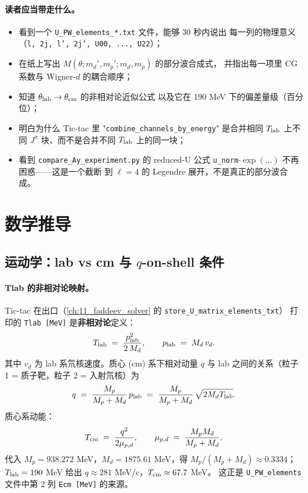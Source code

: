 \paragraph{读者应当带走什么。}
\begin{itemize}
  \item 看到一个 \texttt{U\_PW\_elements\_*.txt} 文件，能够 30 秒内说出
        每一列的物理意义（\texttt{l, 2j, l', 2j', U00, ..., U22}）；
  \item 在纸上写出 \(M(\theta; m_d', m_p'; m_d, m_p)\) 的部分波合成式，
        并指出每一项里 CG 系数与 Wigner-\(d\) 的耦合顺序；
  \item 知道 \(\theta_{\rm lab} \to \theta_{\rm cm}\) 的非相对论近似公式
        以及它在 190 MeV 下的偏差量级（百分位）；
  \item 明白为什么 Tic-tac 里 "\texttt{combine\_channels\_by\_energy}"
        是合并相同 \({T_{\text{lab}}}\) 上不同 \(J^\pi\) 块、而不是合并不同
        \({T_{\text{lab}}}\) 上的同一块；
  \item 看到 \texttt{compare\_Ay\_experiment.py} 的 reduced-U 公式
        \texttt{u\_norm}\(\cdot \exp(\ldots)\) 不再困惑——这是一个截断
        到 \(\ell=4\) 的 Legendre 展开，不是真正的部分波合成。
\end{itemize}

\section{数学推导}
\label{sec:ch12-math}

\subsection{运动学：lab vs cm 与 \texorpdfstring{$q$-on-shell}{q-on-shell} 条件}
\label{subsec:ch12-kinematics}

\paragraph{Tlab 的非相对论映射。}
Tic-tac 在出口（\cref{ch:11_faddeev_solver} 的 \texttt{store\_U\_matrix\_elements\_txt}）
打印的 \texttt{Tlab [MeV]} 是\textbf{非相对论}定义：
\begin{equation}
\label{eq:ch12-Tlab-def}
{T_{\text{lab}}} \;=\; \frac{p_{\rm lab}^2}{2\,M_d}, \qquad
p_{\rm lab} \;=\; M_d\,v_d.
\end{equation}
其中 \(v_d\) 为 lab 系氘核速度。质心 (cm) 系下相对动量 \(q\) 与 lab
之间的关系（粒子 1 = 质子靶，粒子 2 = 入射氘核）为
\begin{equation}
\label{eq:ch12-qcm-from-Tlab}
q \;=\; \frac{M_p}{M_p + M_d}\, p_{\rm lab}
     \;=\; \frac{M_p}{M_p + M_d}\,\sqrt{2 M_d {T_{\text{lab}}}}.
\end{equation}
质心系动能：
\begin{equation}
\label{eq:ch12-Ecm-from-Tlab}
{T_{\text{cm}}} \;=\; \frac{q^2}{2\mu_{p,d}}, \qquad
\mu_{p,d} \;=\; \frac{M_p M_d}{M_p + M_d}.
\end{equation}
代入 \(M_p = 938.272\) MeV，\(M_d = 1875.61\) MeV，得 \(M_p/(M_p + M_d) \approx 0.3334\)；
\({T_{\text{lab}}} = 190\) MeV 给出 \(q \approx 281\) MeV/c，\({T_{\text{cm}}} \approx 67.7\) MeV。
这正是 \texttt{U\_PW\_elements} 文件中第 2 列 \texttt{Ecm [MeV]} 的来源。

